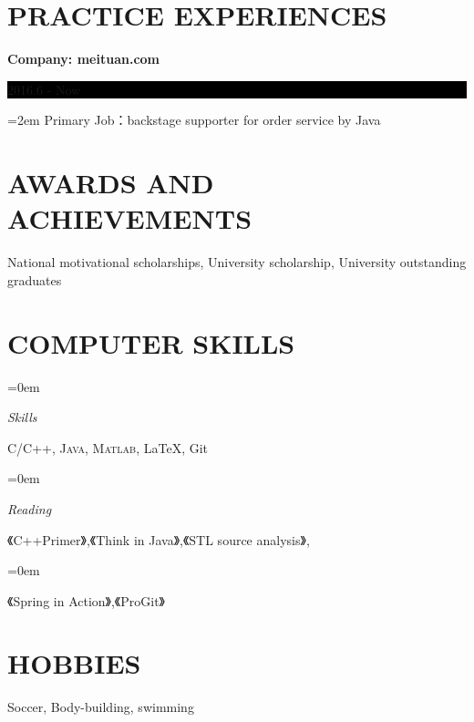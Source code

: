 \documentclass[paper=a4,fontsize=11pt]{scrartcl} %
\newlength{\spacebox}
\newcommand{\NewPart}[1]{\section*{\uppercase{#1}}}
\newcommand{\PersonalEntry}[2]{
		\hfill %
		\textit{#1}		       %
		#2 \par}    %
\newcommand{\SkillsEntry}[2]{      %
		\noindent\hangindent=0em\hangafter=0 %
		\parbox{\spacebox}{        %
		\textit{#1}}			   %
		\hspace{1.5em} #2 \par}    %
\newcommand{\EducationEntry}[4]{
		\noindent \textbf{#1} \hfill      %
		\colorbox{Black}{%
			\parbox{6em}{%
			\hfill\color{White}#2}} \par  %
		\noindent \textit{#3} \par        %
		\noindent\hangindent=2em\hangafter=0 \small #4 %
		\normalsize \par}
\begin{document}
\begin{CJK}{UTF8}{gbsn}
\NewPart{Practice Experiences}{}
\EducationEntry{Company: meituan.com}{2016.6 - Now}{}{Primary Job：backstage supporter for order service by Java}


\NewPart{Awards and Achievements}{}
National motivational scholarships, University scholarship, University outstanding graduates

\NewPart{Computer Skills}{}

\SkillsEntry{Skills}{\textsc{C/C++}, \textsc{Java}, \textsc{Matlab}, \LaTeX, Git}
\SkillsEntry{Reading}{《C++Primer》,《Think in Java》,《STL source analysis》,}
\SkillsEntry{}{《Spring in Action》,《ProGit》}



\NewPart{Hobbies}{}
Soccer, Body-building, swimming


\end{CJK}
\end{document}
